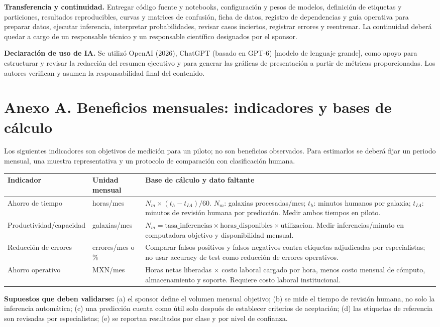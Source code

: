 \documentclass[letterpaper,11pt]{article}
\begin{document}
\textbf{Transferencia y continuidad.} Entregar código fuente y notebooks, configuración y pesos de modelos, definición de etiquetas y particiones, resultados reproducibles, curvas y matrices de confusión, ficha de datos, registro de dependencias y guía operativa para preparar datos, ejecutar inferencia, interpretar probabilidades, revisar casos inciertos, registrar errores y reentrenar. La continuidad deberá quedar a cargo de un responsable técnico y un responsable científico designados por el sponsor.\par
\textbf{Declaración de uso de IA.} Se utilizó OpenAI (2026), ChatGPT (basado en GPT-6) [modelo de lenguaje grande], como apoyo para estructurar y revisar la redacción del resumen ejecutivo y para generar las gráficas de presentación a partir de métricas proporcionadas. Los autores verifican y asumen la responsabilidad final del contenido.\par
\printbibliography[title={Referencias}]
\clearpage
\appendix
\section*{Anexo A. Beneficios mensuales: indicadores y bases de cálculo}
Los siguientes indicadores son objetivos de medición para un piloto; no son beneficios observados. Para estimarlos se deberá fijar un periodo mensual, una muestra representativa y un protocolo de comparación con clasificación humana.
\begin{tabularx}{\linewidth}{p{3.2cm}p{3.0cm}X}
\toprule\textbf{Indicador} & \textbf{Unidad mensual} & \textbf{Base de cálculo y dato faltante}\\\midrule
Ahorro de tiempo & horas/mes & $N_m\times(t_h-t_{IA})/60$. $N_m$: galaxias procesadas/mes; $t_h$: minutos humanos por galaxia; $t_{IA}$: minutos de revisión humana por predicción. Medir ambos tiempos en piloto.\\
Productividad/capacidad & galaxias/mes & $N_m=\mathrm{tasa\_inferencias}\times\mathrm{horas\_disponibles}\times\mathrm{utilizacion}$. Medir inferencias/minuto en computadora objetivo y disponibilidad mensual.\\
Reducción de errores & errores/mes o \% & Comparar falsos positivos y falsos negativos contra etiquetas adjudicadas por especialistas; no usar accuracy de test como reducción de errores operativos.\\
Ahorro operativo & MXN/mes & Horas netas liberadas $\times$ costo laboral cargado por hora, menos costo mensual de cómputo, almacenamiento y soporte. Requiere costo laboral institucional.\\
\bottomrule
\end{tabularx}
\vspace{4pt}
\textbf{Supuestos que deben validarse:} (a) el sponsor define el volumen mensual objetivo; (b) se mide el tiempo de revisión humana, no solo la inferencia automática; (c) una predicción cuenta como útil solo después de establecer criterios de aceptación; (d) las etiquetas de referencia son revisadas por especialistas; (e) se reportan resultados por clase y por nivel de confianza.\par
\end{document}
